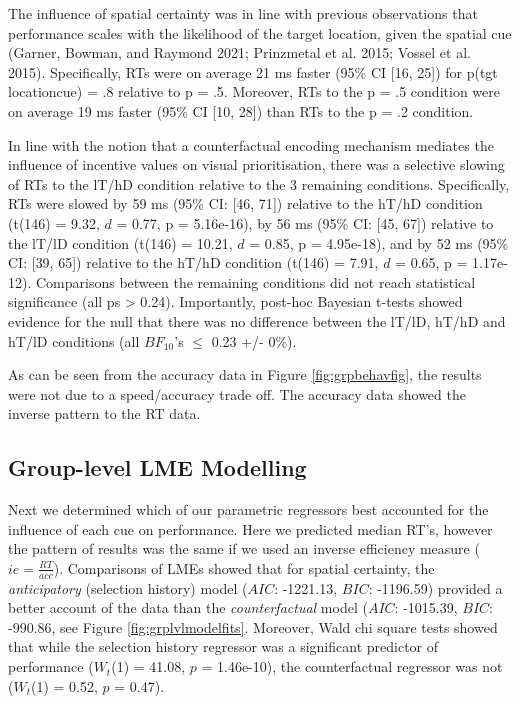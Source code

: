 \documentclass[11pt,halfline,a4paper,]{ouparticle}
\begin{document}
The influence of spatial certainty was in line with previous observations that performance scales with the likelihood of the target location, given the spatial cue (Garner, Bowman, and Raymond 2021; Prinzmetal et al. 2015; Vossel et al. 2015). Specifically, RTs were on average 21 ms faster (95\% CI {[}16, 25{]}) for p(tgt location\textbar cue) = .8 relative to p = .5. Moreover, RTs to the p = .5 condition were on average 19 ms faster (95\% CI {[}10, 28{]}) than RTs to the p = .2 condition.

In line with the notion that a counterfactual encoding mechanism mediates the influence of incentive values on visual prioritisation, there was a selective slowing of RTs to the lT/hD condition relative to the 3 remaining conditions. Specifically, RTs were slowed by 59 ms (95\% CI: {[}46, 71{]}) relative to the hT/hD condition (t(146) = 9.32, \(d\) = 0.77, p = 5.16e-16), by 56 ms (95\% CI: {[}45, 67{]}) relative to the lT/lD condition (t(146) = 10.21, \(d\) = 0.85, p = 4.95e-18), and by 52 ms (95\% CI: {[}39, 65{]}) relative to the hT/hD condition (t(146) = 7.91, \(d\) = 0.65, p = 1.17e-12). Comparisons between the remaining conditions did not reach statistical significance (all ps \textgreater{} 0.24). Importantly, post-hoc Bayesian t-tests showed evidence for the null that there was no difference between the lT/lD, hT/hD and hT/lD conditions (all \(BF_{10}\)'s \(\leq\) 0.23 +/- 0\%).

As can be seen from the accuracy data in Figure \ref{fig:grpbehavfig}, the results were not due to a speed/accuracy trade off. The accuracy data showed the inverse pattern to the RT data.

\hypertarget{group-level-lme-modelling}{%
\subsection{Group-level LME Modelling}\label{group-level-lme-modelling}}

\label{sec:GrpLvlLME}

Next we determined which of our parametric regressors best accounted for the influence of each cue on performance. Here we predicted median RT's, however the pattern of results was the same if we used an inverse efficiency measure (\(ie = \frac{RT}{acc}\)). Comparisons of LMEs showed that for spatial certainty, the \emph{anticipatory} (selection history) model (\(AIC\): -1221.13, \(BIC\): -1196.59) provided a better account of the data than the \emph{counterfactual} model (\(AIC\): -1015.39, \(BIC\): -990.86, see Figure \ref{fig:grplvlmodelfits}. Moreover, Wald chi square tests showed that while the selection history regressor was a significant predictor of performance (\(W_{t}\)(1) = 41.08, \(p\) = 1.46e-10), the counterfactual regressor was not (\(W_{t}\)(1) = 0.52, \(p\) = 0.47).
\end{document}
